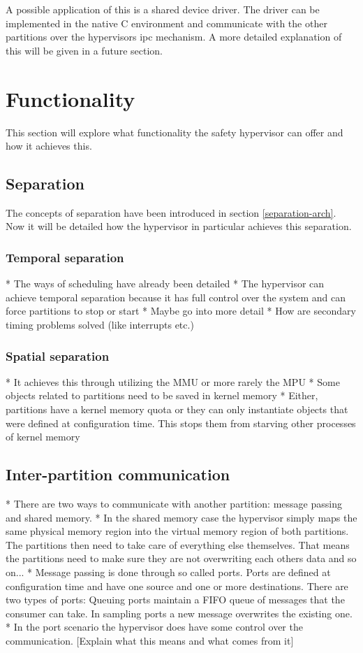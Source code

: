 A possible application of this is a shared device driver. The driver can be implemented in the native C environment and communicate with the other partitions over the hypervisors \acrshort{ipc} mechanism. A more detailed explanation of this will be given in a future section.


\section{Functionality}
This section will explore what functionality the safety hypervisor can offer and how it achieves this.
\subsection{Separation}
The concepts of separation have been introduced in section \ref{separation-arch}. Now it will be detailed how the hypervisor in particular achieves this separation.
\subsubsection{Temporal separation}
* The ways of scheduling have already been detailed
* The hypervisor can achieve temporal separation because it has full control over the system and can force partitions to stop or start
* Maybe go into more detail
* How are secondary timing problems solved (like interrupts etc.)
\subsubsection{Spatial separation}
* It achieves this through utilizing the MMU or more rarely the MPU
* Some objects related to partitions need to be saved in kernel memory
* Either, partitions have a kernel memory quota or they can only instantiate objects that were defined at configuration time. This stops them from starving other processes of kernel memory
\subsection{Inter-partition communication}
* There are two ways to communicate with another partition: message passing and shared memory.
* In the shared memory case the hypervisor simply maps the same physical memory region into the virtual memory region of both partitions. The partitions then need to take care of everything else themselves. That means the partitions need to make sure they are not overwriting each others data and so on...
* Message passing is done through so called ports. Ports are defined at configuration time and have one source and one or more destinations. There are two types of ports: Queuing ports maintain a FIFO queue of messages that the consumer can take. In sampling ports a new message overwrites the existing one. 
* In the port scenario the hypervisor does have some control over the communication. [Explain what this means and what comes from it]
